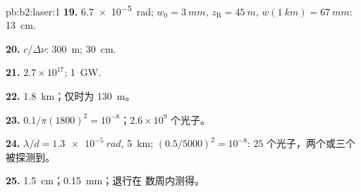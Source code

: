 \begin{solution}{pb:b2:laser:1}
\textbf{19.} \qty{6.7e-5}{rad}; $w_0 = \qty{3}{mm}$, $z_{\text{R}} = \qty{45}{m}$,
$w(\qty{1}{km}) = \qty{67}{mm}$: \qty{13}{cm}.

\textbf{20.} $c/\Delta\nu$: \qty{300}{m}; \qty{30}{cm}.

\textbf{21.} $2.7 \times 10^{17}$; \qty{1}{GW}.

\textbf{22.} \qty{1.8}{km}；仅时为 \qty{130}{m}。

\textbf{23.} $0.1/\pi(1800)^2 = 10^{-8}$；$2.6 \times 10^9$ 个光子。

\textbf{24.} $\lambda/d = \qty{1.3e-5}{rad}$, \qty{5}{km}; $(0.5/5000)^2 = 10^{-8}$:
$25$ 个光子，两个或三个被探测到。

\textbf{25.} \qty{1.5}{cm}；\qty{0.15}{mm}；退行在
数周内测得。
\end{solution}
